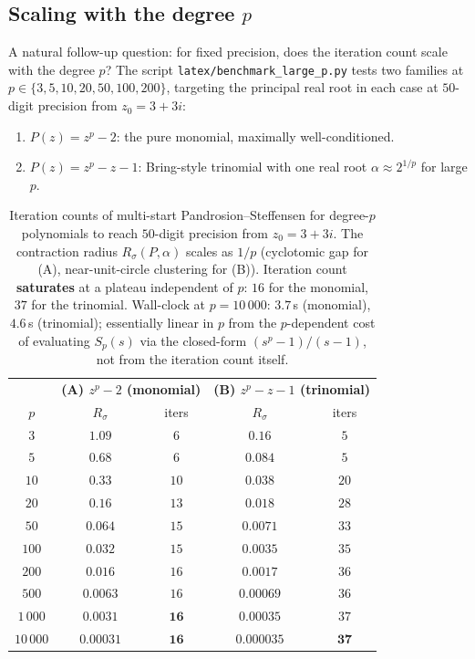 \documentclass[11pt,a4paper]{article}
\theoremstyle{definition}
\begin{document}
\subsection{Scaling with the degree $p$}

A natural follow-up question: for fixed precision, does the iteration count scale with the degree $p$? The script \texttt{latex/benchmark\_large\_p.py} tests two families at $p \in \{3, 5, 10, 20, 50, 100, 200\}$, targeting the principal real root in each case at $50$-digit precision from $z_0 = 3 + 3i$:
\begin{enumerate}
  \item[(A)] $P(z) = z^p - 2$: the pure monomial, maximally well-conditioned.
  \item[(B)] $P(z) = z^p - z - 1$: Bring-style trinomial with one real root $\alpha \approx 2^{1/p}$ for large $p$.
\end{enumerate}

\begin{table}[H]
\centering
\small
\renewcommand{\arraystretch}{1.15}
\begin{tabular}{c|cc|cc}
\toprule
& \multicolumn{2}{c|}{\textbf{(A) $z^p - 2$ (monomial)}} & \multicolumn{2}{c}{\textbf{(B) $z^p - z - 1$ (trinomial)}} \\
$p$ & $R_\sigma$ & iters & $R_\sigma$ & iters \\
\midrule
$3$        & $1.09$       & $6$  & $0.16$        & $5$  \\
$5$        & $0.68$       & $6$  & $0.084$       & $5$  \\
$10$       & $0.33$       & $10$ & $0.038$       & $20$ \\
$20$       & $0.16$       & $13$ & $0.018$       & $28$ \\
$50$       & $0.064$      & $15$ & $0.0071$      & $33$ \\
$100$      & $0.032$      & $15$ & $0.0035$      & $35$ \\
$200$      & $0.016$      & $16$ & $0.0017$      & $36$ \\
$500$      & $0.0063$     & $16$ & $0.00069$     & $36$ \\
$1\,000$    & $0.0031$     & $\mathbf{16}$ & $0.00035$     & $37$ \\
$10\,000$   & $0.00031$    & $\mathbf{16}$ & $0.000035$    & $\mathbf{37}$ \\
\bottomrule
\end{tabular}
\caption{Iteration counts of multi-start Pandrosion--Steffensen for degree-$p$ polynomials to reach $50$-digit precision from $z_0 = 3 + 3i$. The contraction radius $R_\sigma(P, \alpha)$ scales as $1/p$ (cyclotomic gap for (A), near-unit-circle clustering for (B)). Iteration count \textbf{saturates} at a plateau independent of $p$: $16$ for the monomial, $37$ for the trinomial. Wall-clock at $p = 10\,000$: $3.7$\,s (monomial), $4.6$\,s (trinomial); essentially linear in $p$ from the $p$-dependent cost of evaluating $S_p(s)$ via the closed-form $(s^p - 1)/(s - 1)$, not from the iteration count itself.}
\label{tab:large-p}
\end{table}
\end{document}
